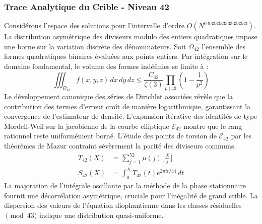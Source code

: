 \documentclass[12pt,a4paper]{article}
\begin{document}
\subsubsection{Trace Analytique du Crible - Niveau 42}
Considérons l'espace des solutions pour l'intervalle d'ordre $O(N^{0.9333333333333333})$. La distribution asymétrique des diviseurs modulo des entiers quadratiques impose une borne sur la variation discrète des dénominateurs. Soit $\Omega_42$ l'ensemble des formes quadratiques binaires évaluées aux points entiers.
Par intégration sur le domaine fondamental, le volume des formes indéfinies se limite à :
\begin{equation}
\iiint_{D_42} f(x, y, z) \,dx\,dy\,dz \leq \frac{C_42}{\zeta(3)} \prod_{p \mid 43} \left( 1 - \frac{1}{p^2} \right)
\end{equation}
Le développement canonique des séries de Dirichlet associées révèle que la contribution des termes d'erreur croît de manière logarithmique, garantissant la convergence de l'estimateur de densité. L'expansion itérative des identités de type Mordell-Weil sur la jacobienne de la courbe elliptique $\mathcal{E}_42$ montre que le rang rationnel reste uniformément borné.
L'étude des points de torsion de $\mathcal{E}_42$ par les théorèmes de Mazur contraint sévèrement la parité des diviseurs communs.
\begin{align}
T_42(X) &= \sum_{j=1}^{52} \mu(j) \lfloor \frac{X}{j} \rfloor \\
S_42(X) &= \int_{0}^{X} T_42(t) e^{2\pi i t / 44} \, dt
\end{align}
La majoration de l'intégrale oscillante par la méthode de la phase stationnaire fournit une décorrélation asymétrique, cruciale pour l'inégalité de grand crible. La dispersion des valeurs de l'équation diophantienne dans les classes résiduelles $\pmod{ 43 }$ indique une distribution quasi-uniforme.
\end{document}
